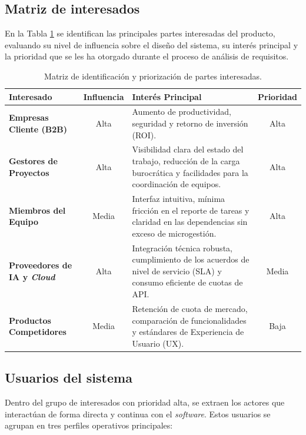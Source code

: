 \subsection{Matriz de interesados}
En la Tabla \ref{tab:stakeholders} se identifican las principales partes interesadas del producto, evaluando su nivel de influencia sobre el diseño del sistema, su interés principal y la prioridad que se les ha otorgado durante el proceso de análisis de requisitos.

\begin{table}[htbp]
    \centering
    \renewcommand{\arraystretch}{1.4}
    \begin{tabular}{@{} p{3cm} c p{6cm} c @{}}
        \toprule
        \textbf{Interesado} & \textbf{Influencia} & \textbf{Interés Principal} & \textbf{Prioridad} \\
        \midrule
        \textbf{Empresas Cliente (B2B)} & Alta & Aumento de productividad, seguridad y retorno de inversión (ROI). & Alta \\
        
        \textbf{Gestores de Proyectos} & Alta & Visibilidad clara del estado del trabajo, reducción de la carga burocrática y facilidades para la coordinación de equipos. & Alta \\
        
        \textbf{Miembros del Equipo} & Media & Interfaz intuitiva, mínima fricción en el reporte de tareas y claridad en las dependencias sin exceso de microgestión. & Alta \\
        
        \textbf{Proveedores de \ac{IA} y \emph{Cloud}} & Alta & Integración técnica robusta, cumplimiento de los acuerdos de nivel de servicio (SLA) y consumo eficiente de cuotas de API. & Media \\
        
        \textbf{Productos Competidores} & Media & Retención de cuota de mercado, comparación de funcionalidades y estándares de Experiencia de Usuario (UX). & Baja \\
        \bottomrule
    \end{tabular}
    \caption{Matriz de identificación y priorización de partes interesadas.}
    \label{tab:stakeholders}
\end{table}

\subsection{Usuarios del sistema}
Dentro del grupo de interesados con prioridad alta, se extraen los actores que interactúan de forma directa y continua con el \emph{software}. Estos usuarios se agrupan en tres perfiles operativos principales:

